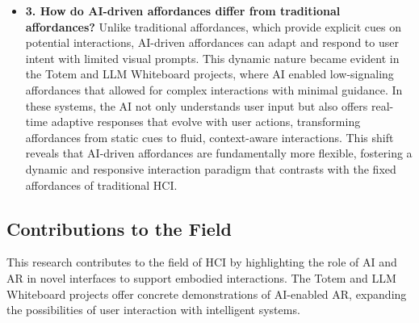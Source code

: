 \begin{itemize}
    \item \textbf{3. How do AI-driven affordances differ from traditional affordances?} Unlike traditional affordances, which provide explicit cues on potential interactions, AI-driven affordances can adapt and respond to user intent with limited visual prompts.
    This dynamic nature became evident in the Totem and LLM Whiteboard projects, where AI enabled low-signaling affordances that allowed for complex interactions with minimal guidance.
    In these systems, the AI not only understands user input but also offers real-time adaptive responses that evolve with user actions, transforming affordances from static cues to fluid, context-aware interactions.
    This shift reveals that AI-driven affordances are fundamentally more flexible, fostering a dynamic and responsive interaction paradigm that contrasts with the fixed affordances of traditional HCI.

\end{itemize}


\subsection{Contributions to the Field}

This research contributes to the field of HCI by highlighting the role of AI and AR in novel interfaces to support embodied interactions.
The Totem and LLM Whiteboard projects offer concrete demonstrations of AI-enabled AR, expanding the possibilities of user interaction with intelligent systems.

